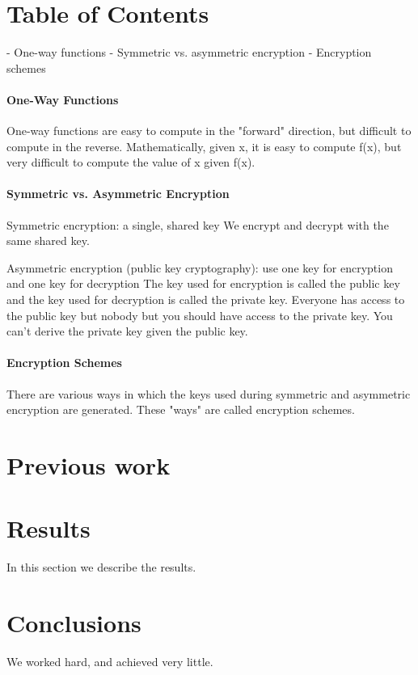 \documentclass[12pt]{article}
\begin{document}
\maketitle

\section{Table of Contents}
- One-way functions
- Symmetric vs. asymmetric encryption
- Encryption schemes

\paragraph{One-Way Functions}
One-way functions are easy to compute in the "forward" direction, but difficult to compute in the reverse. Mathematically, given x, it is easy to compute f(x), but very difficult to compute the value of x given f(x). 


\paragraph{Symmetric vs. Asymmetric Encryption}
Symmetric encryption: a single, shared key
We encrypt and decrypt with the same shared key.

Asymmetric encryption (public key cryptography): use one key for encryption and one key for decryption
The key used for encryption is called the public key and the key used for decryption is called the private key. Everyone has access to the public key but nobody but you should have access to the private key. You can't derive the private key given the public key.


\paragraph{Encryption Schemes}
There are various ways in which the keys used during symmetric and asymmetric encryption are generated. These "ways" are called encryption schemes.

\section{Previous work}\label{previous work}

\section{Results}\label{results}
In this section we describe the results.

\section{Conclusions}\label{conclusions}
We worked hard, and achieved very little.
\end{document}
